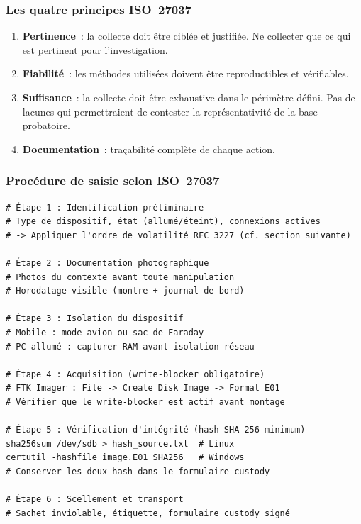 \subsubsection*{Les quatre principes ISO~27037}

\begin{enumerate}
    \item \textbf{Pertinence}~: la collecte doit être ciblée et justifiée.
          Ne collecter que ce qui est pertinent pour l'investigation.
    \item \textbf{Fiabilité}~: les méthodes utilisées doivent être
          reproductibles et vérifiables.
    \item \textbf{Suffisance}~: la collecte doit être exhaustive dans
          le périmètre défini. Pas de lacunes qui permettraient de contester
          la représentativité de la base probatoire.
    \item \textbf{Documentation}~: traçabilité complète de chaque action.
\end{enumerate}

\subsubsection*{Procédure de saisie selon ISO~27037}

\begin{lstlisting}[language=bash_forensique,
    caption={Checklist de saisie ISO~27037, séquence minimale}]
# Étape 1 : Identification préliminaire
# Type de dispositif, état (allumé/éteint), connexions actives
# -> Appliquer l'ordre de volatilité RFC 3227 (cf. section suivante)

# Étape 2 : Documentation photographique
# Photos du contexte avant toute manipulation
# Horodatage visible (montre + journal de bord)

# Étape 3 : Isolation du dispositif
# Mobile : mode avion ou sac de Faraday
# PC allumé : capturer RAM avant isolation réseau

# Étape 4 : Acquisition (write-blocker obligatoire)
# FTK Imager : File -> Create Disk Image -> Format E01
# Vérifier que le write-blocker est actif avant montage

# Étape 5 : Vérification d'intégrité (hash SHA-256 minimum)
sha256sum /dev/sdb > hash_source.txt  # Linux
certutil -hashfile image.E01 SHA256   # Windows
# Conserver les deux hash dans le formulaire custody

# Étape 6 : Scellement et transport
# Sachet inviolable, étiquette, formulaire custody signé
\end{lstlisting}


